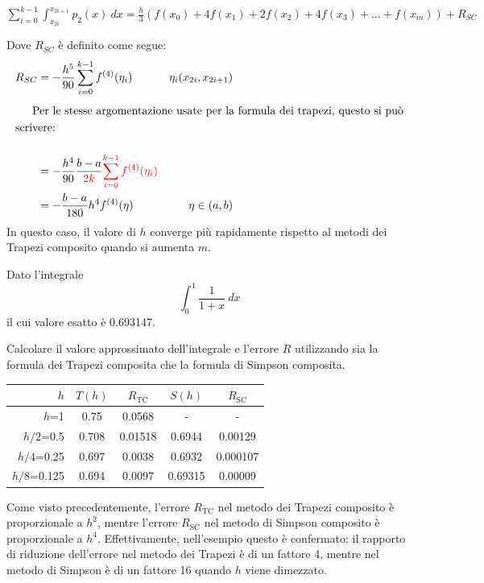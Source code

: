 \documentclass{article}
\begin{document}
\begin{itemize}
        $\displaystyle\sum_{i=0}^{k-1}\displaystyle\int_{x_{2i}}^{x_{2i+1}}p_2(x)\
        dx=\frac{h}{3}(f(x_0)+4f(x_1)+2f(x_2)+4f(x_3)+\ldots+f(x_m))+R_{SC}$

        Dove $R_{SC}$ è definito come segue:
        \begin{equation}\label{eq:error_sc}
           \begin{aligned}
               R_{SC}&=-\frac{h^5}{90}\displaystyle\sum_{i=0}^{k-1}f^{(4)}(\eta_i)
                     & \eta_i(x_{2i},x_{2i+1})
               \\ 
               \alignedintertext{Per le stesse argomentazione usate per la
               formula dei trapezi, questo si può scrivere:}\\
                     &=-\frac{h^4}{90}\frac{b-a}{{\color{red}2k}}{\color{red}\displaystyle\sum_{i=0}^{k-1}f^{(4)}(\eta_i)}\\
                     &=-\frac{b-a}{180}h^4f^{(4)}(\eta) & \eta\in(a,b)
           \end{aligned} 
        \end{equation}
        In questo caso, il valore di $h$ converge più rapidamente rispetto al
        metodi dei Trapezi composito quando si aumenta $m$.
\end{itemize}
\begin{example}
    Dato l'integrale
   $$\displaystyle\int_{0}^{1}\frac{1}{1+x}\ dx$$
   il cui valore esatto è 0.693147.

   Calcolare il valore approssimato dell'integrale e l'errore $R$ utilizzando sia la formula
   dei Trapezi composita che la formula di Simpson composita.
    
   \begin{center}
       \begin{tabular}{|r|c|c|c|c|}
           \hline
           \( h \) & \( T(h) \) & \( R_{\text{TC}} \) & \( S(h) \) & \( R_{\text{SC}} \) \\
           \hline
           \( h \)=1 & 0.75 & 0.0568 & - & - \\
           \( h/2 \)=0.5 & 0.708  & 0.01518  & 0.6944 &  0.00129 \\
           \( h/4 \)=0.25 &  0.697 & 0.0038  & 0.6932  & 0.000107 \\
           \( h/8 \)=0.125 &  0.694 & 0.0097  & 0.69315 & 0.00009 \\
           \hline
       \end{tabular}
   \end{center}

   Come visto precedentemente, l'errore \( R_{\text{TC}} \) nel metodo dei
   Trapezi composito è proporzionale a \( h^2 \), mentre l'errore \(
   R_{\text{SC}} \) nel metodo di Simpson composito è proporzionale a \( h^4
   \). Effettivamente, nell'esempio questo è confermato: il rapporto di
   riduzione dell'errore nel metodo dei Trapezi è di un fattore 4, mentre nel
   metodo di Simpson è di un fattore 16 quando \( h \) viene dimezzato.
\end{example}
\end{document}
